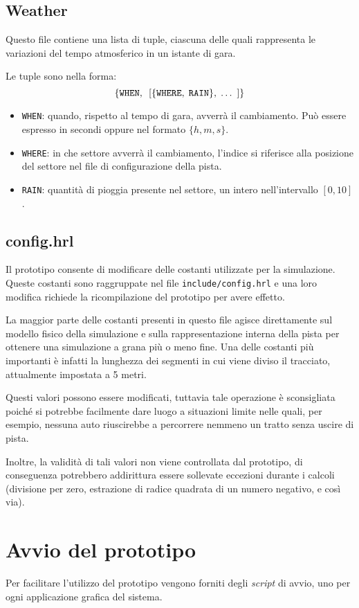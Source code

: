 \section*{Weather}
Questo file contiene una lista di tuple, ciascuna delle quali rappresenta le variazioni del tempo atmosferico in un istante di gara.

Le tuple sono nella forma:
\[ \{\mbox{\texttt{WHEN}},\;\: [\{\mbox{\texttt{WHERE}},\; \mbox{\texttt{RAIN}}\},\; \ldots\;\: ]\} \]
\begin{itemize}
\item \texttt{WHEN}: quando, rispetto al tempo di gara, avverrà il cambiamento. Può essere espresso in secondi oppure nel formato $\{h,m,s\}$.
\item \texttt{WHERE}: in che settore avverrà il cambiamento, l'indice si riferisce alla posizione del settore nel file di configurazione della pista.
\item \texttt{RAIN}: quantità di pioggia presente nel settore, un intero nell'intervallo $[0, 10]$.
\end{itemize}

\section*{config.hrl}
Il prototipo consente di modificare delle costanti utilizzate per la simulazione.
Queste costanti sono raggruppate nel file \texttt{include/config.hrl} e una loro modifica richiede la ricompilazione del prototipo per avere effetto.

La maggior parte delle costanti presenti in questo file agisce direttamente sul modello fisico della simulazione e sulla rappresentazione interna della pista per ottenere una simulazione a grana più o meno fine. Una delle costanti più importanti è infatti la lunghezza dei segmenti in cui viene diviso il tracciato, attualmente impostata a 5 metri.

Questi valori possono essere modificati, tuttavia tale operazione è sconsigliata poiché si potrebbe facilmente dare luogo a situazioni limite nelle quali, per esempio, nessuna auto riuscirebbe a percorrere nemmeno un tratto senza uscire di pista.

Inoltre, la validità di tali valori non viene controllata dal prototipo, di conseguenza potrebbero addirittura essere sollevate eccezioni durante i calcoli (divisione per zero, estrazione di radice quadrata di un numero negativo, e così via).


\chapter{Avvio del prototipo}
Per facilitare l'utilizzo del prototipo vengono forniti degli \textit{script} di avvio, uno per ogni applicazione grafica del sistema.

